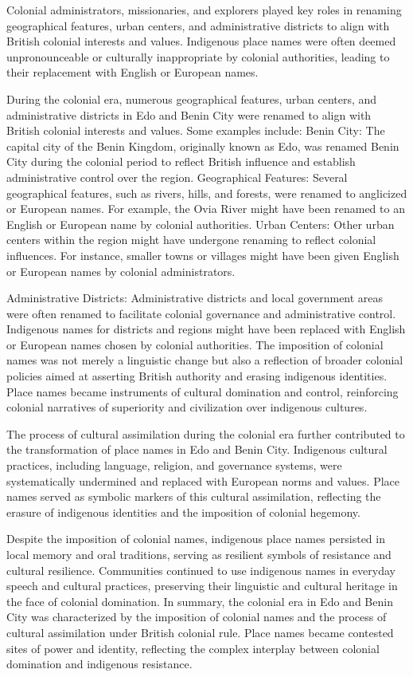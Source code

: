 Colonial administrators, missionaries, and explorers played key roles in renaming geographical features, urban centers, and administrative districts to align with British colonial interests and values. Indigenous place names were often deemed unpronounceable or culturally inappropriate by colonial authorities, leading to their replacement with English or European names\cite{Charles2007}.

During the colonial era, numerous geographical features, urban centers, and administrative districts in Edo and Benin City were renamed to align with British colonial interests and values. Some examples include:
Benin City: The capital city of the Benin Kingdom, originally known as Edo, was renamed Benin City during the colonial period to reflect British influence and establish administrative control over the region.
Geographical Features: Several geographical features, such as rivers, hills, and forests, were renamed to anglicized or European names. For example, the Ovia River might have been renamed to an English or European name by colonial authorities.
Urban Centers: Other urban centers within the region might have undergone renaming to reflect colonial influences. For instance, smaller towns or villages might have been given English or European names by colonial administrators.

Administrative Districts: Administrative districts and local government areas were often renamed to facilitate colonial governance and administrative control. Indigenous names for districts and regions might have been replaced with English or European names chosen by colonial authorities.
The imposition of colonial names was not merely a linguistic change but also a reflection of broader colonial policies aimed at asserting British authority and erasing indigenous identities. Place names became instruments of cultural domination and control, reinforcing colonial narratives of superiority and civilization over indigenous cultures\cite{Charles2007}.

The process of cultural assimilation during the colonial era further contributed to the transformation of place names in Edo and Benin City. Indigenous cultural practices, including language, religion, and governance systems, were systematically undermined and replaced with European norms and values. Place names served as symbolic markers of this cultural assimilation, reflecting the erasure of indigenous identities and the imposition of colonial hegemony.

Despite the imposition of colonial names, indigenous place names persisted in local memory and oral traditions, serving as resilient symbols of resistance and cultural resilience. Communities continued to use indigenous names in everyday speech and cultural practices, preserving their linguistic and cultural heritage in the face of colonial domination\cite{Charles2007}.
In summary, the colonial era in Edo and Benin City was characterized by the imposition of colonial names and the process of cultural assimilation under British colonial rule. Place names became contested sites of power and identity, reflecting the complex interplay between colonial domination and indigenous resistance.
